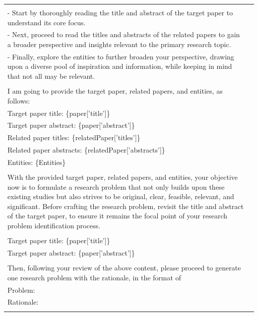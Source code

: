 \begin{table}
{\begin{tabular}{ll}
{            \multicolumn{1}{p{.92\textwidth}}{{Your approach should be systematic:}} \\ 
            \multicolumn{1}{p{.92\textwidth}}{{- Start by thoroughly reading the title and abstract of the target paper to understand its core focus.}} \\
            \multicolumn{1}{p{.92\textwidth}}{{- Next, proceed to read the titles and abstracts of the related papers to gain a broader perspective and insights relevant to the primary research topic.}} \\
            \multicolumn{1}{p{.92\textwidth}}{{- Finally, explore the entities to further broaden your perspective, drawing upon a diverse pool of inspiration and information, while keeping in mind that not all may be relevant.}} \\ \\
            \multicolumn{1}{p{.92\textwidth}}{{I am going to provide the target paper, related papers, and entities, as follows: }} \\
            \multicolumn{1}{p{.92\textwidth}}{{Target paper title: \{paper['title']\}}} \\
            \multicolumn{1}{p{.92\textwidth}}{{Target paper abstract: \{paper['abstract']\} }} \\
            \multicolumn{1}{p{.92\textwidth}}{{Related paper titles: \{relatedPaper['titles']\}}} \\
            \multicolumn{1}{p{.92\textwidth}}{{Related paper abstracts: \{relatedPaper['abstracts']\} }} \\
            \multicolumn{1}{p{.92\textwidth}}{{Entities: \{Entities\} }} \\ \\
            \multicolumn{1}{p{.92\textwidth}}{{With the provided target paper, related papers, and entities, your objective now is to formulate a research problem that not only builds upon these existing studies but also strives to be original, clear, feasible, relevant, and significant. Before crafting the research problem, revisit the title and abstract of the target paper, to ensure it remains the focal point of your research problem identification process.}} \\ \\
            \multicolumn{1}{p{.92\textwidth}}{{Target paper title: \{paper['title']\}}} \\
            \multicolumn{1}{p{.92\textwidth}}{{Target paper abstract: \{paper['abstract']\} }} \\ \\
            \multicolumn{1}{p{.92\textwidth}}{{Then, following your review of the above content, please proceed to generate one research problem with the rationale, in the format of }} \\
            \multicolumn{1}{p{.92\textwidth}}{{Problem: }} \\
            \multicolumn{1}{p{.92\textwidth}}{{Rationale: }} \\
        } \\
        \bottomrule
        \end{tabular}
    }
\end{table}

